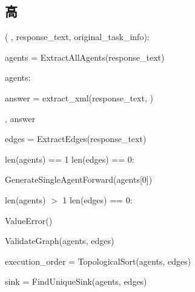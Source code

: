 \subsection{高 \masness}



\begin{subagent}[title=高 DoM 解析器]

  (
, response\_text, original\_task\_info):

\quad {}

\quad agents = ExtractAllAgents(response\_text)

\quad {}  agents:

\quad\quad {}

\quad\quad answer = extract\_xml(response\_text, )

\quad\quad {} , answer \\


\quad {}

\quad edges = ExtractEdges(response\_text) \\


\quad {}

\quad {} len(agents) == 1  len(edges) == 0:

\quad\quad {} GenerateSingleAgentForward(agents[0]) \\


\quad {}

\quad {} len(agents) $>$ 1  len(edges) == 0:

\quad\quad {} ValueError() \\


\quad {}

\quad ValidateGraph(agents, edges) \\


\quad {}

\quad execution\_order = TopologicalSort(agents, edges)

\quad sink = FindUniqueSink(agents, edges) \\


\quad {}


\end{subagent}

